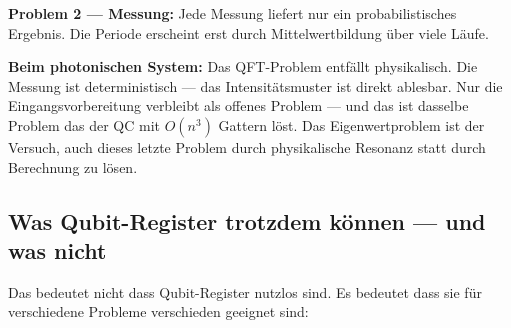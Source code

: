 \begin{foundation}
\begin{important}
\textbf{Problem 2 --- Messung:}
Jede Messung liefert nur ein probabilistisches Ergebnis.
Die Periode erscheint erst durch
Mittelwertbildung über viele Läufe.

\textbf{Beim photonischen System:}
Das QFT-Problem entfällt physikalisch.
Die Messung ist deterministisch ---
das Intensitätsmuster ist direkt ablesbar.
Nur die Eingangsvorbereitung verbleibt als offenes Problem ---
und das ist dasselbe Problem das der QC
mit $O(n^3)$ Gattern löst.
Das Eigenwertproblem ist der Versuch,
auch dieses letzte Problem durch physikalische
Resonanz statt durch Berechnung zu lösen.
\end{important}

\end{foundation}

\subsection{Was Qubit-Register trotzdem können ---
  und was nicht}

Das bedeutet nicht dass Qubit-Register nutzlos sind.
Es bedeutet dass sie für verschiedene Probleme
verschieden geeignet sind:

\begin{center}
\end{center}

